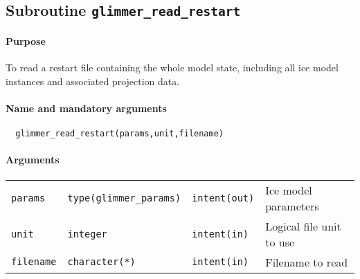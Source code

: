 \subsection{Subroutine \texttt{glimmer\_read\_restart}}
%
\paragraph{Purpose}
%
To read a restart file containing the whole model state, including all ice
model instances and associated projection data.
%
\paragraph{Name and mandatory arguments}
%
\begin{verbatim}
  glimmer_read_restart(params,unit,filename)
\end{verbatim}
%
\paragraph{Arguments}
%
\begin{center}
\begin{tabular}{llll}
\texttt{params} & \texttt{type(glimmer\_params)} & \texttt{intent(out)} &
Ice model parameters \\
\texttt{unit} & \texttt{integer} & \texttt{intent(in)} & Logical file unit to
use \\
\texttt{filename} & \texttt{character(*)} & \texttt{intent(in)} & Filename to
read \\
\end{tabular}
\end{center}
